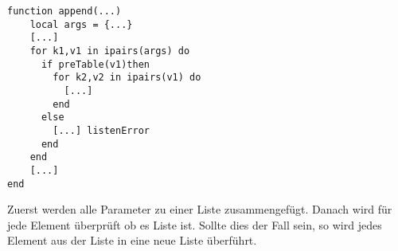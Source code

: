 \begin{lstlisting}
function append(...)
    local args = {...}
    [...]
    for k1,v1 in ipairs(args) do
      if preTable(v1)then
        for k2,v2 in ipairs(v1) do 
          [...]
        end
      else
        [...] listenError
      end
    end
    [...]
end
\end{lstlisting}

Zuerst werden alle Parameter zu einer Liste zusammengefügt. Danach wird für jede Element überprüft ob es Liste ist. Sollte dies der Fall sein, so wird jedes Element aus der Liste in eine neue Liste überführt.


\printbibliography
{}

